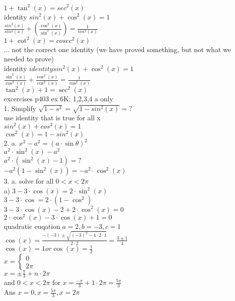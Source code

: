 \documentclass{article}
\begin{document}
  $1+\tan^2(x)=sec^2(x)$\\
  identity $sin^2(x)+\cos^2(x)=1$\\
  $\frac{sin^2(x)}{sin^2(x)}+(\frac{\cos^2(x)}{\sin^2(x)})=\frac{1}{sin^2(x)}$\\
  $1 + \cot^2(x)=cosec^2(x)$\\
  ... not the correct one identity (we have proved something, but not what we needed to prove)\\
  identity $identity sin^2(x)+\cos^2(x)=1$\\
  $\frac{\sin^2(x)}{\cos^2(x)}+\frac{\cos^2(x)}{\cos^2(x)}=\frac{1}{\cos^2(x)}$\\
  $\tan^2(x)+1=\sec^2(x)$\\
  excercises p403 ex 6K: 1,2,3,4 a only\\
  1. Simplify $\sqrt{1-s^2}=\sqrt{1-sin^2(x)}=?$\\
  use identity that is true for all x\\
  $sin^2(x)+cos^2(x)=1$\\
  $\cos^2(x)=1-sin^2(x)$\\
  2. a. $x^2-a^2=(a\cdot\sin\theta)^2$\\
  $a^2\cdot\sin^2(x)-a^2$\\
  $a^2\cdot(\sin^2(x)-1)=?$\\
  $-a^2(1-\sin^2(x))=-a^2\cdot\cos^2(x)$\\
  3. a. solve for all $0<x<2\pi$\\
  a) $3-3\cdot\cos(x)=2\cdot\sin^2(x)$\\
  $3-3\cdot\cos=2\cdot(1-\cos^2)$\\
  $3-3\cdot\cos(x)-2+2\cdot\cos^2(x)=0$\\
  $2\cdot\cos^2(x)-3\cdot\cos(x)+1=0$\\
  quadratic euqation $a=2,b=-3,c=1$\\
  $\cos(x)=\frac{-(-3)\pm\sqrt{(-3)^2-4\cdot2\cdot1}}{2\cdot2}=\frac{3\pm1}{4}$\\
  $\cos(x)=1 or \cos(x)=\frac{1}{2}$\\
  $x=\begin{cases}
    0\\2\pi
  \end{cases}$\\
  $x=\pm\frac{\pi}{3}+n\cdot2\pi$\\
  and $0<x<2\pi$ for $x=\frac{-\pi}{3}+1\cdot2\pi=\frac{5\pi}{3}$\\
  Ans $x=0,x=\frac{5\pi}{3},x=2\pi$\\

   
\end{document}

